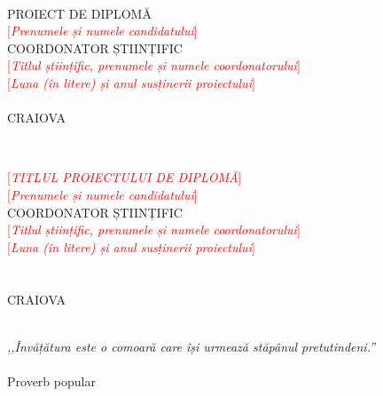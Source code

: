 \thispagestyle{fancy}


\phantom{.}
\\[18\baselineskip]
\begin{center}
    \fontsize{14}{11}\selectfont
PROIECT DE DIPLOMĂ
\\[2\baselineskip]
\textcolor{red}{[\textit{Prenumele și numele candidatului}]}
\\[10\baselineskip]
\fontsize{12}{11}\selectfont
COORDONATOR ȘTIINȚIFIC
\\[2\baselineskip]
\textcolor{red}{[\textit{Titlul științific, prenumele și numele coordonatorului}]}
\\[19\baselineskip]
\textcolor{red}{[\textit{Luna (în litere) și anul susținerii proiectului}]}\\~\\
CRAIOVA
\end{center}

\newpage
\thispagestyle{fancy}



\phantom{.}
\\[19\baselineskip]
\begin{center}
    
    \fontsize{14}{11}\selectfont
\textcolor{red}{[\textit{TITLUL PROIECTULUI DE DIPLOMĂ}]}
\\[2\baselineskip]
\textcolor{red}{[\textit{Prenumele și numele candidatului}]}
\\[13\baselineskip]
\fontsize{12}{11}\selectfont
COORDONATOR ȘTIINȚIFIC
\\[2\baselineskip]
\textcolor{red}{[\textit{Titlul științific, prenumele și numele coordonatorului}]}
\\[13\baselineskip]
\textcolor{red}{[\textit{Luna (în litere) și anul susținerii proiectului}]}\\~\\~\\
CRAIOVA

\end{center}

\newpage
{}
\setcounter{page}{3}

\begin{flushright}
    \phantom{.}
    \\[3\baselineskip]
    \textit{,,Învățătura este o comoară care își urmează stăpânul pretutindeni.''}\\~\\
Proverb popular
\end{flushright}
